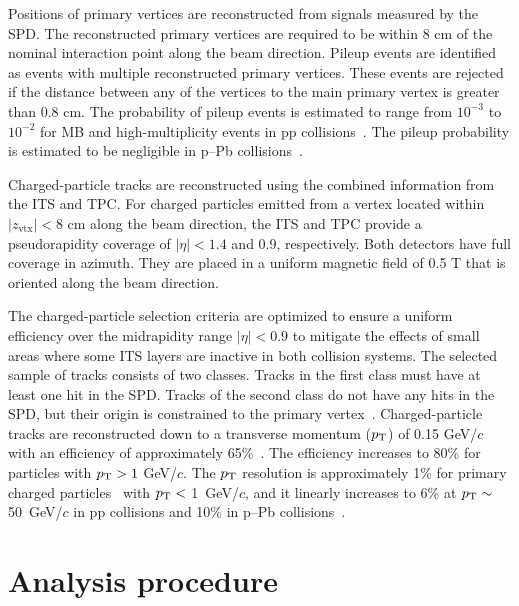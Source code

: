 Positions of primary vertices are reconstructed from signals measured by the SPD. The reconstructed primary vertices are required to be within 8 cm of the nominal interaction point along the beam direction. 
Pileup events are identified as events with multiple reconstructed primary vertices. These events are rejected if the distance between any of the vertices to the main primary vertex is greater than 0.8 cm.
The probability of pileup events is estimated to range from $10^{-3}$ to $10^{-2}$ for MB and high-multiplicity events in pp collisions~\cite{ALICE:2020swj}. The pileup probability is estimated to be negligible in p--Pb collisions~\cite{ALICE:2017svf}. 

Charged-particle tracks are reconstructed using the combined information from the ITS and TPC.
For charged particles emitted from a vertex located within $|z_\mathrm{vtx}|<8$ cm along the beam direction, the ITS and TPC provide a pseudorapidity coverage of $|\eta|<1.4$ and 0.9, respectively. Both detectors have full coverage in azimuth. They are placed in a uniform magnetic field of 0.5 T that is oriented along the beam direction.

The charged-particle selection criteria are optimized to ensure a uniform efficiency over the midrapidity range $|\eta|<0.9$ to mitigate the effects of small areas where some ITS layers are inactive in both collision systems. The selected sample of tracks consists of two classes. Tracks in the first class must have at least one hit in the SPD. Tracks of the second class do not have any hits in the SPD, but their origin is constrained to the primary vertex~\cite{ALICE:2012eyl}. 
Charged-particle tracks are reconstructed down to a transverse momentum ($p_\mathrm{T}$) of 0.15 GeV/$c$ with an efficiency of approximately 65\%~\cite{Ivanov:2006yra}. The efficiency increases to 80\% for particles with $p_\mathrm{T}>1$ GeV/$c$. The $p_\mathrm{T}$ resolution is approximately 1\% for primary charged particles~\cite{ALICE-PUBLIC-2017-005} with $p_\mathrm{T}<$ 1~GeV/$c$, and it linearly increases to 6\% at $p_\mathrm{T}\sim$ 50~GeV/$c$ in pp collisions and 10\% in p--Pb collisions~\cite{ALICE:2018vuu}.


\section{Analysis procedure}
\label{sec:ana}
